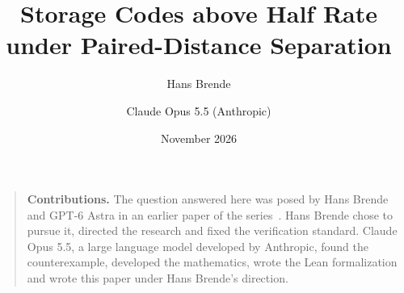 \documentclass[11pt]{article}
\title{Storage Codes above Half Rate under Paired-Distance Separation}
\author{Hans Brende \and Claude Opus 5.5 (Anthropic)}
\date{November 2026}
\begin{document}
\maketitle

\begin{abstract}

\end{abstract}

\begin{quote}\small
\textbf{Contributions.} The question answered here was posed by Hans Brende and GPT-6 Astra in an earlier paper of the
series~\cite{DirectedRecovery2026}. Hans Brende chose to pursue it, directed the research and fixed the verification
standard. Claude Opus 5.5, a large language model developed by Anthropic, found the counterexample, developed the
mathematics, wrote the Lean formalization and wrote this paper under Hans Brende's direction.
\end{quote}

\tableofcontents
\clearpage













\appendix





\end{document}
